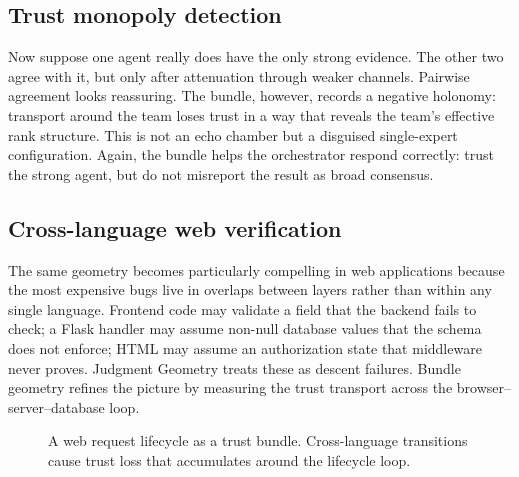 \documentclass[11pt]{article}
\newcommand{\Hol}{\mathrm{Hol}}
\begin{document}
\subsection{Trust monopoly detection}

Now suppose one agent really does have the only strong evidence.  The other two
agree with it, but only after attenuation through weaker channels.  Pairwise
agreement looks reassuring.  The bundle, however, records a negative holonomy:
transport around the team loses trust in a way that reveals the team's effective
rank structure.  This is not an echo chamber but a disguised single-expert
configuration.  Again, the bundle helps the orchestrator respond correctly:
trust the strong agent, but do not misreport the result as broad consensus.

\subsection{Cross-language web verification}\label{sec:webapps}

The same geometry becomes particularly compelling in web applications because the
most expensive bugs live in overlaps between layers rather than within any single
language.  Frontend code may validate a field that the backend fails to check;
a Flask handler may assume non-null database values that the schema does not
enforce; HTML may assume an authorization state that middleware never proves.
Judgment Geometry treats these as descent failures.  Bundle geometry refines the
picture by measuring the trust transport across the browser--server--database
loop.

\begin{figure}[H]
\centering
{}
\caption{A web request lifecycle as a trust bundle.  Cross-language transitions
cause trust loss that accumulates around the lifecycle loop.}
\label{fig:web-bundle}
\end{figure}
\end{document}
